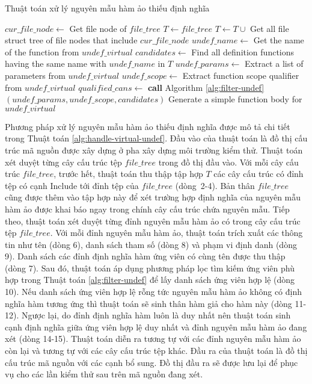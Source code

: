 \begin{algorithm}[t]
    \small
    \caption{Thuật toán xử lý nguyên mẫu hàm ảo thiếu định nghĩa}
    \label{alg:handle-virtual-undef}
     {
        $cur\_file\_node \leftarrow $ Get file node of $file\_tree$\;
        $T \leftarrow {file\_tree}$\;
        $T \leftarrow T \cup$ {Get all file struct tree of file nodes that include $cur\_file\_node$}\;
         {
            $undef\_name \leftarrow$ Get the name of the function from $undef\_virtual$\;
            $candidates \leftarrow$ Find all definition functions having the same name with $undef\_name$ in $T$\;
            $undef\_params \leftarrow$ Extract a list of parameters from $undef\_virtual$\;
            $undef\_scope\leftarrow$ Extract function scope qualifier from $undef\_virtual$\;
            $qualified\_cans\leftarrow$ \textbf{call} Algorithm \autoref{alg:filter-undef} $(undef\_params, undef\_scope, candidates)$\;
             {
                Generate a simple function body for $undef\_virtual$\;
            }
        }
    }
\end{algorithm}

Phương pháp xử lý nguyên mẫu hàm ảo thiếu định nghĩa được mô tả chi tiết trong Thuật toán \autoref{alg:handle-virtual-undef}. Đầu vào của thuật toán là đồ thị cấu trúc mã nguồn được xây dựng ở pha xây dựng môi trường kiểm thử. Thuật toán xét duyệt từng cây cấu trúc tệp $file\_tree$ trong đồ thị đầu vào. Với mỗi cây cấu trúc $file\_tree$, trước hết, thuật toán thu thập tập hợp $T$ các cây cấu trúc có đỉnh tệp có cạnh Include tới đỉnh tệp của $file\_tree$ (dòng~2-4). Bản thân $file\_tree$ cũng được thêm vào tập hợp này để xét trường hợp định nghĩa của nguyên mẫu hàm ảo được khai báo ngay trong chính cây cấu trúc chứa nguyên mẫu. Tiếp theo, thuật toán xét duyệt từng đỉnh nguyên mẫu hàm ảo có trong cây cấu trúc tệp $file\_tree$. Với mỗi đỉnh nguyên mẫu hàm ảo, thuật toán trích xuất các thông tin như tên (dòng 6), danh sách tham số (dòng 8) và phạm vi định danh (dòng 9). Danh sách các đỉnh định nghĩa hàm ứng viên có cùng tên được thu thập (dòng 7). Sau đó, thuật toán áp dụng phương pháp lọc tìm kiếm ứng viên phù hợp trong Thuật toán \autoref{alg:filter-undef} để lấy danh sách ứng viên hợp lệ (dòng 10). Nếu danh sách ứng viên hợp lệ rỗng tức nguyên mẫu hàm ảo không có định nghĩa hàm tương ứng thì thuật toán sẽ sinh thân hàm giả cho hàm này (dòng 11-12). Ngược lại, do đỉnh định nghĩa hàm luôn là duy nhất nên thuật toán sinh cạnh định nghĩa giữa ứng viên hợp lệ duy nhất và đỉnh nguyên mẫu hàm ảo đang xét (dòng 14-15). Thuật toán diễn ra tương tự với các đỉnh nguyên mẫu hàm ảo còn lại và tương tự với các cây cấu trúc tệp khác. Đầu ra của thuật toán là đồ thị cấu trúc mã nguồn với các cạnh bổ sung. Đồ thị đầu ra sẽ được lưu lại để phục vụ cho các lần kiểm thử sau trên mã nguồn đang xét.


